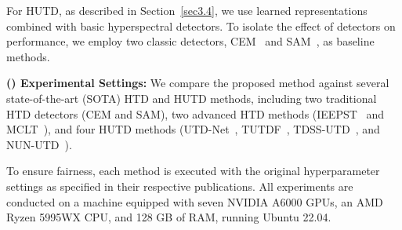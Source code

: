 For HUTD, as described in Section~\ref{sec3.4}, we use learned representations combined with basic hyperspectral detectors. To isolate the effect of detectors on performance, we employ two classic detectors, CEM~\cite{KRUSE1993145} and SAM~\cite{Manolakis2002}, as baseline methods.

\textbf{() Experimental Settings:} 
We compare the proposed method against several state-of-the-art (SOTA) HTD and HUTD methods, including two traditional HTD detectors (CEM and SAM), two advanced HTD methods (IEEPST~\cite{IEEPST} and MCLT~\cite{Wang2024}), and four HUTD methods (UTD-Net~\cite{Qi2021}, TUTDF~\cite{LiZheyong2023}, TDSS-UTD~\cite{Li2023}, and NUN-UTD~\cite{Liu2024}).

To ensure fairness, each method is executed with the original hyperparameter settings as specified in their respective publications. All experiments are conducted on a machine equipped with seven NVIDIA A6000 GPUs, an AMD Ryzen 5995WX CPU, and 128 GB of RAM, running Ubuntu 22.04.

